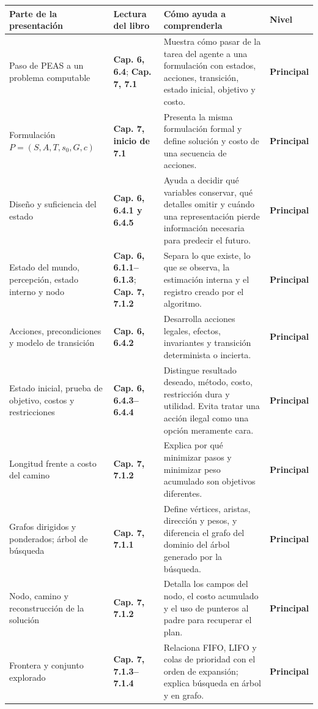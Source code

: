 \documentclass[10pt,a4paper]{article}
\newcommand{\capitulo}[1]{\textbf{\color{UAPTeal}#1}}
\newcommand{\principal}{\textbf{Principal}}
\newcommand{\encabezadotabla}{%
  \rowcolor{UAPNavy}
  \color{white}\textbf{Parte de la presentación} &
  \color{white}\textbf{Lectura del libro} &
  \color{white}\textbf{Cómo ayuda a comprenderla} &
  \color{white}\textbf{Nivel} \\
  \endhead
}
\begin{document}
\begin{longtable}{P{3.35cm}P{4.05cm}P{6.25cm}P{2.15cm}}
\toprule
\encabezadotabla
\midrule
Paso de PEAS a un problema computable & \capitulo{Cap. 6, 6.4}; \capitulo{Cap. 7, 7.1} & Muestra cómo pasar de la tarea del agente a una formulación con estados, acciones, transición, estado inicial, objetivo y costo. & \principal \\
Formulación $P=(S,A,T,s_0,G,c)$ & \capitulo{Cap. 7, inicio de 7.1} & Presenta la misma formulación formal y define solución y costo de una secuencia de acciones. & \principal \\
Diseño y suficiencia del estado & \capitulo{Cap. 6, 6.4.1 y 6.4.5} & Ayuda a decidir qué variables conservar, qué detalles omitir y cuándo una representación pierde información necesaria para predecir el futuro. & \principal \\
Estado del mundo, percepción, estado interno y nodo & \capitulo{Cap. 6, 6.1.1--6.1.3}; \capitulo{Cap. 7, 7.1.2} & Separa lo que existe, lo que se observa, la estimación interna y el registro creado por el algoritmo. & \principal \\
Acciones, precondiciones y modelo de transición & \capitulo{Cap. 6, 6.4.2} & Desarrolla acciones legales, efectos, invariantes y transición determinista o incierta. & \principal \\
Estado inicial, prueba de objetivo, costos y restricciones & \capitulo{Cap. 6, 6.4.3--6.4.4} & Distingue resultado deseado, método, costo, restricción dura y utilidad. Evita tratar una acción ilegal como una opción meramente cara. & \principal \\
Longitud frente a costo del camino & \capitulo{Cap. 7, 7.1.2} & Explica por qué minimizar pasos y minimizar peso acumulado son objetivos diferentes. & \principal \\
Grafos dirigidos y ponderados; árbol de búsqueda & \capitulo{Cap. 7, 7.1.1} & Define vértices, aristas, dirección y pesos, y diferencia el grafo del dominio del árbol generado por la búsqueda. & \principal \\
Nodo, camino y reconstrucción de la solución & \capitulo{Cap. 7, 7.1.2} & Detalla los campos del nodo, el costo acumulado y el uso de punteros al padre para recuperar el plan. & \principal \\
Frontera y conjunto explorado & \capitulo{Cap. 7, 7.1.3--7.1.4} & Relaciona FIFO, LIFO y colas de prioridad con el orden de expansión; explica búsqueda en árbol y en grafo. & \principal \\

\end{longtable}
\end{document}
